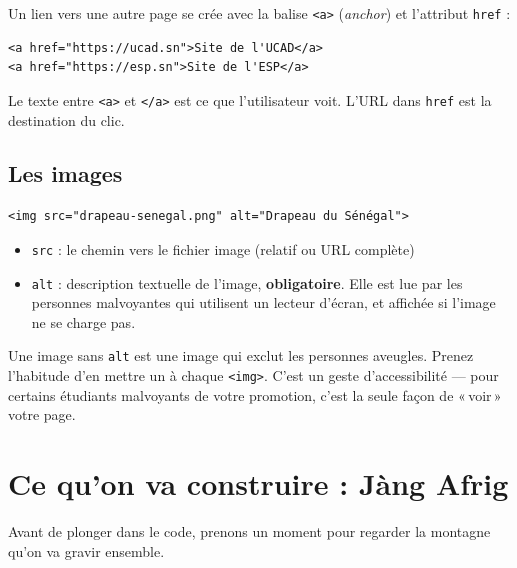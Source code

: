 \documentclass[11pt,a4paper]{article}
\begin{document}
Un lien vers une autre page se crée avec la balise \texttt{<a>}
(\emph{anchor}) et l'attribut \texttt{href} :

\begin{lstlisting}[language=HTML5]
<a href="https://ucad.sn">Site de l'UCAD</a>
<a href="https://esp.sn">Site de l'ESP</a>
\end{lstlisting}

Le texte entre \texttt{<a>} et \texttt{</a>} est ce que l'utilisateur voit.
L'URL dans \texttt{href} est la destination du clic.

\subsection{Les images}

\begin{lstlisting}[language=HTML5]
<img src="drapeau-senegal.png" alt="Drapeau du Sénégal">
\end{lstlisting}

\begin{itemize}[nosep]
    \item \texttt{src} : le chemin vers le fichier image (relatif ou URL complète)
    \item \texttt{alt} : description textuelle de l'image, \textbf{obligatoire}. Elle est lue par les personnes malvoyantes qui utilisent un lecteur d'écran, et affichée si l'image ne se charge pas.
\end{itemize}

\begin{attentionbox}
Une image sans \texttt{alt} est une image qui exclut les personnes
aveugles. Prenez l'habitude d'en mettre un à chaque \texttt{<img>}. C'est
un geste d'accessibilité --- pour certains étudiants malvoyants de votre
promotion, c'est la seule façon de «\,voir\,» votre page.
\end{attentionbox}

\newpage

\section{Ce qu'on va construire : Jàng Afrig}

Avant de plonger dans le code, prenons un moment pour regarder la montagne
qu'on va gravir ensemble.
\end{document}

